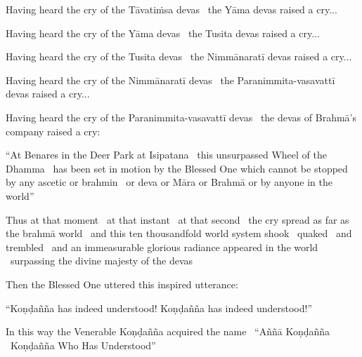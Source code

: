 \begin{english-only-hang}
  Having heard the cry of the Tāvatiṁsa devas \breathmark\ the Yāma devas raised a cry...
\end{english-only-hang}

\begin{english-only-hang}
  Having heard the cry of the Yāma devas \breathmark\ the Tusita devas raised a cry...
\end{english-only-hang}

\begin{english-only-hang}
  Having heard the cry of the Tusita devas \breathmark\ the Nimmānaratī devas raised a cry...
\end{english-only-hang}
\begin{english-only-hang}
  Having heard the cry of the Nimmānaratī devas \breathmark\ the Paranimmita-vasavattī devas raised a cry...
\end{english-only-hang}

\begin{english-only-hang}
  Having heard the cry of the Paranimmita-vasavattī devas \breathmark\ the devas of Brahmā's company raised a cry:
\end{english-only-hang}

\begin{english-only-hang}
  ``At Benares in the Deer Park at Isipatana \breathmark\ this unsurpassed Wheel of the Dhamma \breathmark\ has been set in motion  by the Blessed One  which cannot be stopped by any ascetic or brahmin \breathmark\ or deva or Māra or Brahmā or by anyone in the world''
\end{english-only-hang}

\begin{english-only-hang}
  Thus at that moment \breathmark\ at that instant \breathmark\ at that second \breathmark\ the cry spread as far as the brahmā world \breathmark\ and this ten thousandfold world system shook \breathmark\ quaked \breathmark\ and trembled \breathmark\ and an immeasurable glorious radiance appeared in the world \breathmark\ surpassing the divine majesty of the devas
\end{english-only-hang}

\begin{english-only-hang}
  Then the Blessed One uttered this inspired utterance:
\end{english-only-hang}

\begin{english-only-hang}
  ``Koṇḍañña has indeed understood! Koṇḍañña has indeed understood!''
\end{english-only-hang}

\begin{english-only-hang}
  In this way the Venerable Koṇḍañña acquired the name \breathmark\ ``Aññā Koṇḍañña \breathmark\ Koṇḍañña Who Has Understood''
\end{english-only-hang}

\suttaRef{[SN 56.11]}

